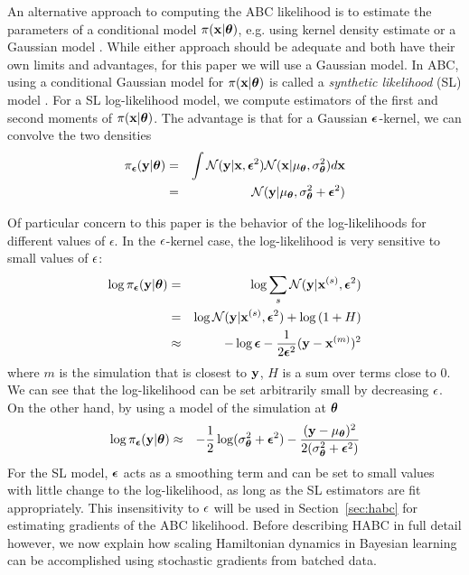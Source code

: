 \documentclass[]{article}
\begin{document}
An alternative approach to computing the ABC likelihood is to estimate the parameters of a conditional model  $\pi({\bf x}|{\bm \theta})$, e.g. using kernel density estimate \cite{TurnerGenLik2014} or a Gaussian model \cite{wood2010statistical}.  While either approach should be adequate and both have their own limits and advantages, for this paper we will use a Gaussian model.  In ABC, using a conditional Gaussian model for  $\pi({\bf x}|{\bm \theta})$ is called a {\em synthetic likelihood} (SL) model \cite{wood2010statistical}.  For a SL log-likelihood model, we compute estimators of the first and second moments of $\pi({\bf x}|{\bm \theta})$.  The advantage is that for a Gaussian ${\bm {\epsilon}}$-kernel, we can convolve the two densities   
\begin{eqnarray}
  \pi_{{\bm {\epsilon}}}( {\bf y} | {\bm \theta} ) & = & \int \mathcal{N}( {\bf y} | {\bf x}, {\bm {\epsilon}}^2 ) \mathcal{N}( {\bf x} | 
  \mu_{{\bm \theta}}, \sigma^2_{{\bm \theta}} ) d{\bf x} \\
                          & = & \mathcal{N}( {\bf y} | \mu_{{\bm \theta}}, \sigma^2_{{\bm \theta}} + {\bm {\epsilon}}^2 )
\end{eqnarray}

Of particular concern to this paper is the behavior of the log-likelihoods for different values of $\epsilon$.  In the $\epsilon$-kernel case, the log-likelihood is very sensitive to small values of $\epsilon$:
\begin{eqnarray}
  \log \pi_{{\bm {\epsilon}}}( {\bf y} | {\bm \theta} ) & = & \log \sum_s \mathcal{N}( {\bf y} | {\bf x}^{(s)}, {\bm {\epsilon}}^2 ) \\
                          & = & \log \mathcal{N}( {\bf y} | {\bf x}^{(s)}, {\bm {\epsilon}}^2 ) + \log\left( 1 + H \right) \\
                          & \approx & -\log {\bm {\epsilon}} -\frac{1}{2 {\bm {\epsilon}}^2} ( {\bf y} - {\bf x}^{(m)} )^2 
\end{eqnarray}
where $m$ is the simulation that is closest to ${\bf y}$, $H$ is a sum over terms close to $0$. We can see that the log-likelihood can be set arbitrarily small by decreasing $\epsilon$.  On the other hand, by using a model of the simulation at ${\bm \theta}$
\begin{eqnarray}
 \log \pi_{{\bm {\epsilon}}}( {\bf y} | {\bm \theta} ) & \approx & -\frac{1}{2} \log (\sigma^2_{{\bm \theta}} + {\bm {\epsilon}}^2 ) -\frac{( {\bf y} - \mu_{{\bm \theta}} )^2 }{2 (\sigma^2_{{\bm \theta}} + {\bm {\epsilon}}^2 )} 
\end{eqnarray}
 For the SL model, ${\bm {\epsilon}}$ acts as a smoothing term and can be set to small values with little change to the log-likelihood, as long as the SL estimators are fit appropriately.  This insensitivity to $\epsilon$ will be used in Section~\ref{sec:habc} for estimating gradients of the ABC likelihood.  Before describing HABC in full detail however, we now explain how scaling Hamiltonian dynamics in Bayesian learning can be accomplished using stochastic gradients from batched data.
 
\end{document}
